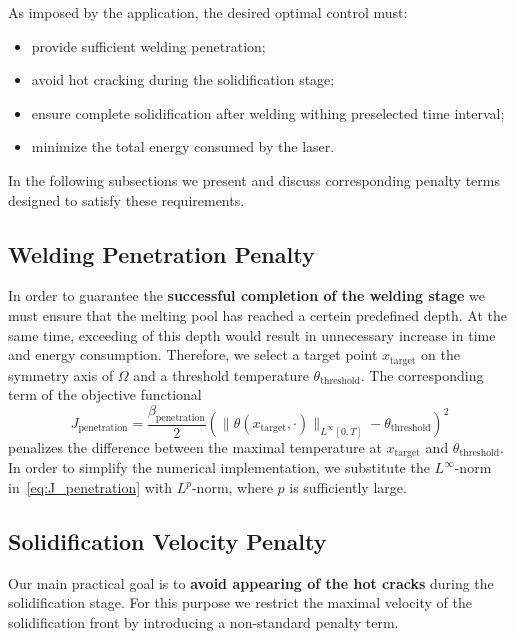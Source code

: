 As imposed by the application, the desired optimal control must:
\begin{itemize}
	\item provide sufficient welding penetration;
	\item avoid hot cracking during the solidification stage;
	\item ensure complete solidification after welding withing preselected time interval;
	\item minimize the total energy consumed by the laser.
\end{itemize}

In the following subsections we present and discuss corresponding penalty terms designed to satisfy these requirements.


\subsection{Welding Penetration Penalty}
\label{subsec:velocity}

In order to guarantee the \textbf{successful completion of the welding stage} we must ensure that the melting pool has reached a certein predefined depth. At the same time, exceeding of this depth would result in unnecessary increase in time and energy consumption. Therefore, we select a target point $x_{\text{target}}$ on the symmetry axis of $\Omega$ and a threshold temperature $\theta_{\text{threshold}}$. The corresponding term of the objective functional
\begin{equation} \label{eq:J_penetration}
	J_{\text{penetration}} = \frac{\beta_\text{penetration}}{2} \left( \| \theta(x_{\text{target}},\cdot) \|_{L^{\infty}[0,T]} - \theta_{\text{threshold}} \right)^2
\end{equation}
penalizes the difference between the maximal temperature at $x_{\text{target}}$ and $\theta_{\text{threshold}}$. In order to simplify the numerical implementation, we substitute the $L^{\infty}$-norm in~\eqref{eq:J_penetration} with $L^{p}$-norm, where $p$ is sufficiently large.


\subsection{Solidification Velocity Penalty}
\label{subsec:velocity}

Our main practical goal is to \textbf{avoid appearing of the hot cracks} during the solidification stage. For this purpose we restrict the maximal velocity of the solidification front by introducing a non-standard penalty term.

